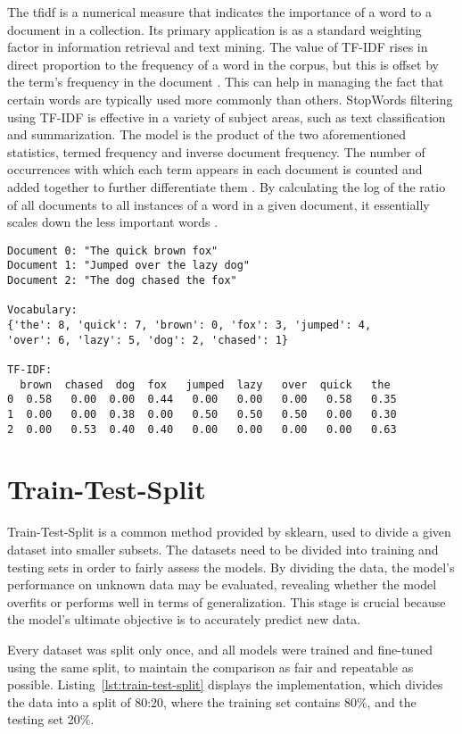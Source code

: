 The \ac{tfidf} is a numerical measure that indicates the importance of a word to a document in a collection. Its primary application is as a standard weighting factor in information retrieval and text mining. The value of TF-IDF rises in direct proportion to the frequency of a word in the corpus, but this is offset by the term's frequency in the document \citep{vijayarani_preprocessing_2015}. This can help in managing the fact that certain words are typically used more commonly than others. StopWords filtering using TF-IDF is effective in a variety of subject areas, such as text classification and summarization. The model is the product of the two aforementioned statistics, termed frequency and inverse document frequency. The number of occurrences with which each term appears in each document is counted and added together to further differentiate them \citep{vijayarani_preprocessing_2015}. By calculating the log of the ratio of all documents to all instances of a word in a given document, it essentially scales down the less important words \citep{tabassum_survey_2020}.

\begin{verbatim}
Document 0: "The quick brown fox"
Document 1: "Jumped over the lazy dog"
Document 2: "The dog chased the fox"

Vocabulary: 
{'the': 8, 'quick': 7, 'brown': 0, 'fox': 3, 'jumped': 4,
'over': 6, 'lazy': 5, 'dog': 2, 'chased': 1}

TF-IDF:
  brown  chased  dog  fox   jumped  lazy   over  quick   the 
0  0.58   0.00  0.00  0.44   0.00   0.00   0.00   0.58   0.35  
1  0.00   0.00  0.38  0.00   0.50   0.50   0.50   0.00   0.30  
2  0.00   0.53  0.40  0.40   0.00   0.00   0.00   0.00   0.63   
\end{verbatim}

\section{Train-Test-Split}

Train-Test-Split is a common method provided by sklearn, used to divide a given dataset into smaller subsets. The datasets need to be divided into training and testing sets in order to fairly assess the models. By dividing the data, the model's performance on unknown data may be evaluated, revealing whether the model overfits or performs well in terms of generalization. This stage is crucial because the model's ultimate objective is to accurately predict new data.

Every dataset was split only once, and all models were trained and fine-tuned using the same split, to maintain the comparison as fair and repeatable as possible. Listing~\ref{lst:train-test-split} displays the implementation, which divides the data into a split of 80:20, where the training set contains 80\%, and the testing set 20\%. 

